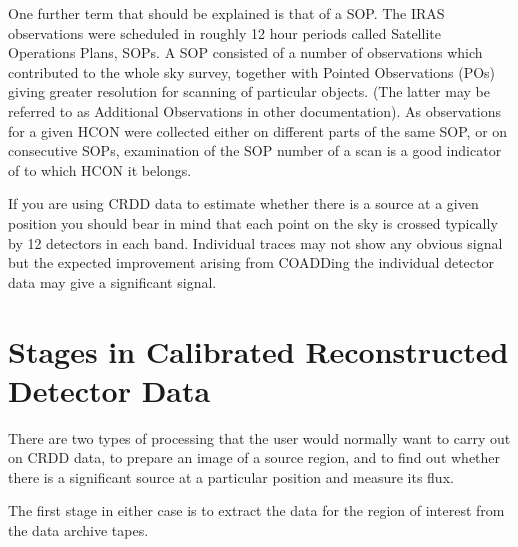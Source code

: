 One further term that should be explained is that of a SOP. The IRAS 
observations were scheduled in roughly 12 hour periods called Satellite
Operations Plans, SOPs. A SOP consisted of a number of observations which
contributed to the whole sky survey, together with Pointed Observations (POs)
giving greater resolution for scanning of particular objects. (The latter may be
referred to as Additional Observations in other documentation). As observations
for a given HCON were collected either on different parts of the same SOP, or
on consecutive SOPs, examination of the SOP number of a scan is a good indicator
of to which HCON it belongs.

If you are using CRDD data to estimate whether there is a source at a given 
position you should bear in mind that each point on the sky is crossed 
typically by 12 detectors in each band. Individual traces may not show any 
obvious signal but the expected improvement arising from COADDing the 
individual detector data may give a significant signal. 

\section{Stages in Calibrated Reconstructed Detector Data 
}
\label{m:stagcrdd}
There are two types of processing that the user would normally want to carry
out on CRDD data, to prepare an image of a source region, and to find out 
whether there is a significant source at a particular position and measure its 
flux.

The first stage in either case is to extract the data for the region of
interest from the data archive tapes.

